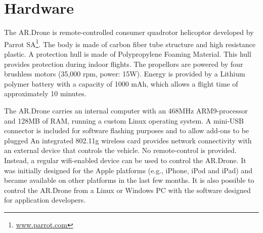 \section{Hardware}
The AR.Drone is remote-controlled consumer quadrotor helicoptor developed by Parrot SA\footnote{\url{www.parrot.com}}.
The body is made of carbon fiber tube structure and high resistance 
plastic.
A protection hull is made of Polypropylene Foaming Material.
This hull provides protection during indoor flights.
The propellors are powered by four brushless motors (35,000 rpm, power: 15W).
Energy is provided by a Lithium polymer battery with a capacity of 1000 mAh, which allows a flight time of approximately 10 minutes.

The AR.Drone carries an internal computer with an 468MHz ARM9-processor and 128MB of RAM, running a custom Linux operating system.
A mini-USB connector is included for software flashing purposes and to allow add-ons to be plugged
An integrated 802.11g wireless card provides network connectivity with an external device that controls the vehicle.
No remote-control is provided. Instead, a regular wifi-enabled device can be used to control the AR.Drone.
It was initially designed for the Apple platforms (e.g., iPhone, iPod and iPad) and became available on other platforms in the last few months.
It is also possible to control the AR.Drone from a Linux or Windows PC with the software designed for application developers.



